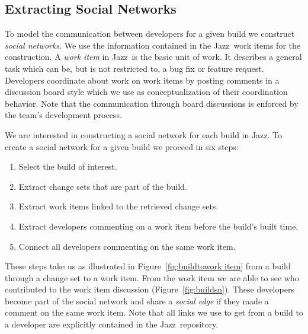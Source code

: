 \documentclass[12pt,oneside]{book}
\begin{document}
\subsection{Extracting Social Networks}
\label{subsec:social}
To model the communication between developers for a given build we construct \emph{social networks}. 
We use the information contained in the Jazz\texttrademark\ work items for the construction. 
A \emph{work item} in Jazz\texttrademark\ is the basic unit of work. 
It describes a general task which can be, but is not restricted to, a bug fix or feature request.
Developers coordinate about work on work items by posting comments in a discussion board style which we use as conceptualization of their coordination behavior.
Note that the communication through board discussions is enforced by the team's development process. 


We are interested in constructing a social network for each
build in Jazz\texttrademark. 
To create a social network for a given build we proceed in six steps:

\begin{enumerate}
\item Select the build of interest.
\item Extract change sets that are part of the build.
\item Extract work items linked to the retrieved change sets.
\item Extract developers commenting on a work item before the build's built time.
\item Connect all developers commenting on the same work item.
\end{enumerate}

These steps take us as illustrated in Figure~\ref{fig:buildtowork item}
from a build through a change set to a work item. From the work item we are able to
see who contributed to the work item discussion (Figure~\ref{fig:buildsn}).
These developers become part of the social network and
share a \emph{social edge} if they made a comment on the same work item.
Note that all links we use to get from a build to a developer are explicitly contained in
the Jazz\texttrademark\ repository.
\end{document}
